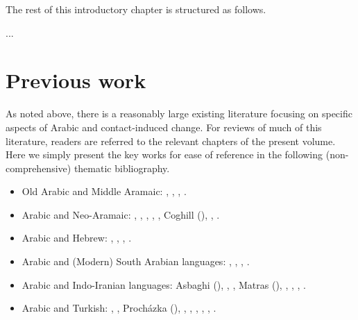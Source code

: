 \documentclass[output=paper]{langsci/langscibook}
\begin{document}
The rest of this introductory chapter is structured as follows.

...


\section{Previous work}\label{introexistingwork}

As noted above, there is a reasonably large existing literature focusing on specific aspects of Arabic and contact-induced change. For reviews of much of this literature, readers are referred to the relevant chapters of the present volume. Here we simply present the key works for ease of reference in the following (non-comprehensive) thematic bibliography.
\begin{itemize}[noitemsep,leftmargin=11pt]
\item[\adfhalfrightarrowhead]Old Arabic and Middle Aramaic: \citet{Fraenkel1886}, \citet{Stein2018}, \citet{Retsö2011}, \citet{Weninger2011Aramaic}.

\item[\adfhalfrightarrowhead]Arabic and Neo-Aramaic: \citet{Sabar1984},
\citet{ArnoldBehnstedt1993}, \citet{Khan2002}, \citet{Arnold2007}, \citet{Borg2008}, Coghill (\citeyear{Coghill2010,Coghill2012,Coghill2015}), \citet{Jastrow2015}, \citet{Owens2016Aramaic}.

\item[\adfhalfrightarrowhead]Arabic and Hebrew:
\citet{Blau1981}, \citet{Nevo1999}, \citet{Yoda2013}, \citet{Horesh2015}.

\item[\adfhalfrightarrowhead]Arabic and (Modern) South Arabian languages: \citet{Diem1979}, \citet{Lonnet2011}, \citet{Zammit2011}, \citet{Watson2018}.

\item[\adfhalfrightarrowhead]Arabic and Indo-Iranian languages: Asbaghi (\citeyear{Asbaghi1987,Asbaghi2011}), \citet{Tsabolov1994}, \citet{Ingham2005}, Matras (\citeyear{Matras2007Domari,Matras2012}), \citet{Gazsi2011}, \citet{Ṣādiqī2011}, \citet{WalAnonby2015}, \citet{Herin2018}.

\item[\adfhalfrightarrowhead]Arabic and Turkish: \citet{BenCheneb1922}, \citet{Reinkowski1995}, Procházka (\citeyear{Procházka2002Adana,Procházka2011Turkish}), \citet{Isaksson2005}, \citet{SánchezVicente2012}, \citet{Haig2014}, \citet{Taylan2017}, \citet{AkkusBenmamoun2018}, \citet{Procházka-Eisl2018}.


\end{itemize}
\end{document}
